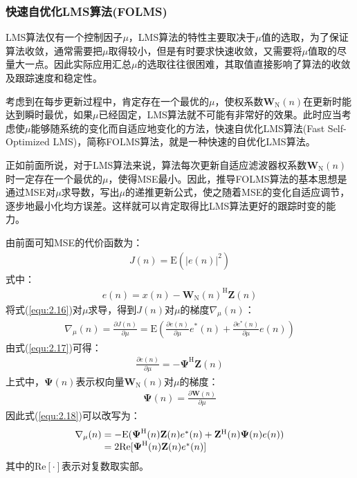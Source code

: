 \subsubsection*{快速自优化LMS算法(FOLMS)}
LMS算法仅有一个控制因子$\mu$，LMS算法的特性主要取决于$\mu$值的选取，为了保证算法收敛，通常需要把$\mu$取得较小，但是有时要求快速收敛，又需要将$\mu$值取的尽量大一点。因此实际应用汇总$\mu$的选取往往很困难，其取值直接影响了算法的收敛及跟踪速度和稳定性。

考虑到在每步更新过程中，肯定存在一个最优的$\mu$，使权系数$\mathbf{W}_{\mathrm{N}}(n)$在更新时能达到瞬时最优，如果$\mu$已经固定，LMS算法就不可能有非常好的效果。此时应当考虑使$\mu$能够随系统的变化而自适应地变化的方法，快速自优化LMS算法(Fast
Self-Optimized
LMS)，简称FOLMS算法，就是一种快速的自优化LMS算法\citep{Bragard1990,George1999,Benveniste1990}。

正如前面所说，对于LMS算法来说，算法每次更新自适应滤波器权系数$\mathbf{W}_{\mathrm{N}}(n)$时一定存在一个最优的$\mu$，使得MSE最小。因此，推导FOLMS算法的基本思想是通过MSE对$\mu$求导数，写出$\mu$的递推更新公式，使之随着MSE的变化自适应调节，逐步地最小化均方误差。这样就可以肯定取得比LMS算法更好的跟踪时变的能力。

由前面可知MSE的代价函数为：
\begin{eqnarray}
    J(n)=\mathrm{E}(|e(n)|^2)
    \label{equ:2.16}
\end{eqnarray}
式中：
\begin{eqnarray}
    e(n)=x(n)-\mathbf{W}_{\mathrm{N}}(n)^{\mathrm{H}}\mathbf{Z}(n)
    \label{equ:2.17}
\end{eqnarray}
将式(\ref{equ:2.16})对$\mu$求导，得到$J(n)$对$\mu$的梯度$\nabla_{\mu}(n)$：
\begin{eqnarray}
    \nabla_{\mu}(n)=\frac{\partial J(n)}{\partial
    \mu}=\mathrm{E}\left(\frac{\partial e(n)}{\partial
    \mu}e^*(n)+\frac{\partial e^*(n)}{\partial \mu}e(n)\right)
    \label{equ:2.18}
\end{eqnarray}
由式(\ref{equ:2.17})可得：
\begin{eqnarray}
    \frac{\partial e(n)}{\partial \mu}=-\boldsymbol{\Psi}^{\mathrm{H}}\mathbf{Z}(n)
    \label{equ:2.19}
\end{eqnarray}
上式中，$\boldsymbol{\Psi}(n)$表示权向量$\mathbf{W}_{\mathrm{N}}(n)$对$\mu$的梯度：
\begin{eqnarray}
    \boldsymbol{\Psi}(n)=\frac{\partial\mathbf{W}(n)}{\partial\mu}
    \label{equ:2.20}
\end{eqnarray}
因此式(\ref{equ:2.18})可以改写为：
\begin{eqnarray}
    \begin{array}{l@{\;=\;}l}
        \nabla_{\mu}(n)&-\mathrm{E}(\boldsymbol{\Psi}^{\mathrm{H}}(n)\mathbf{Z}(n)e^*(n)+\mathbf{Z}^{\mathrm{H}}(n)\boldsymbol{\Psi}(n)e(n))\\
        &2\mathrm{Re}[\boldsymbol{\Psi}^{\mathrm{H}}(n)\mathbf{Z}(n)e^*(n)]
    \end{array}
    \label{equ:2.21}
\end{eqnarray}
其中的$\mathrm{Re}[\cdot]$表示对复数取实部。

